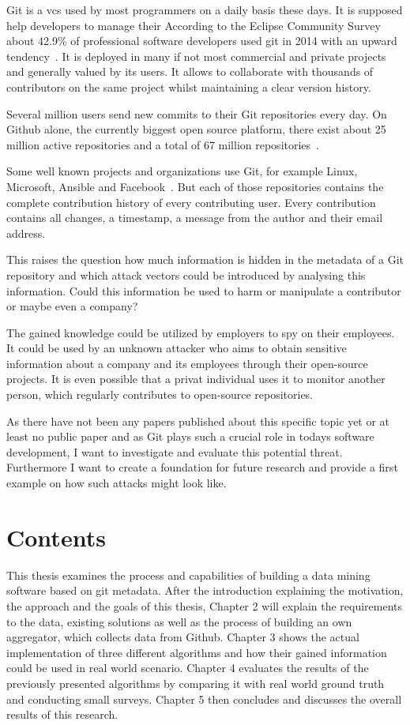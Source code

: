 Git is a \ac{vcs} used by most programmers on a daily basis these days.
It is supposed help developers to manage their
According to the Eclipse Community Survey about 42.9\% of professional software developers used git in 2014 with an upward tendency~\cite{article:git-popularity}.
It is deployed in many if not most commercial and private projects and generally valued by its users.
It allows to collaborate with thousands of contributors on the same project whilst maintaining a clear version history.

Several million users send new commits to their Git repositories every day.
On Github alone, the currently biggest open source platform, there exist about 25 million active repositories and a total of 67 million repositories~\cite{article:github-statistics}.

Some well known projects and organizations use Git, for example Linux, Microsoft, Ansible and Facebook~\cite{article:github-statistics}.
But each of those repositories contains the complete contribution history of every contributing user.
Every contribution contains all changes, a timestamp, a message from the author and their email address.

This raises the question how much information is hidden in the metadata of a Git repository and which attack vectors could be introduced by analysing this information.
Could this information be used to harm or manipulate a contributor or maybe even a company?

The gained knowledge could be utilized by employers to spy on their employees.
It could be used by an unknown attacker who aims to obtain sensitive information about a company and its employees through their open-source projects.
It is even possible that a privat individual uses it to monitor another person, which regularly contributes to open-source repositories.

As there have not been any papers published about this specific topic yet or at least no public paper and as Git plays such a crucial role in todays software development, I want to investigate and evaluate this potential threat.
Furthermore I want to create a foundation for future research and provide a first example on how such attacks might look like.

\section{Contents}
This thesis examines the process and capabilities of building a data mining software based on git metadata.
After the introduction explaining the motivation, the approach and the goals of this thesis, Chapter 2 will explain the requirements to the data, existing solutions as well as the process of building an own aggregator, which collects data from Github.
Chapter 3 shows the actual implementation of three different algorithms and how their gained information could be used in real world scenario.
Chapter 4 evaluates the results of the previously presented algorithms by comparing it with real world ground truth and conducting small surveys.
Chapter 5 then concludes and discusses the overall results of this research.

